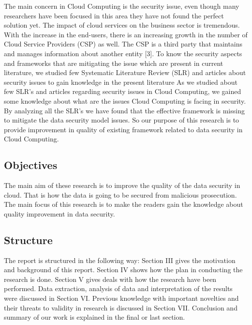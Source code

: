 The main concern in Cloud Computing is the security issue, even though many researchers have been focused in this area they have not found the perfect solution yet. The impact of cloud services on the business sector is tremendous. With the increase in the end-users, there is an increasing growth in the number of Cloud Service Providers (CSP) as well. The CSP is a third party that maintains and manages information about another entity [3]. To know the security aspects and frameworks that are mitigating the issue which are present in current literature, we studied few Systematic Literature Review (SLR) and articles about security issues to gain knowledge in the present literature
As we studied about few SLR’s and articles regarding security issues in Cloud Computing, we gained some knowledge about what are the issues Cloud Computing is facing in security. By analyzing all the SLR’s we have found that the effective framework is missing to mitigate the data security model issues. So our purpose of this research is to provide improvement in quality of existing framework related to data security in Cloud Computing. 

\subsection{Objectives}

The main aim of these research is to improve the quality of the data security in cloud. That is how the data is going to be secured from malicious prosecution.
The main focus of this research is to make the readers gain the knowledge about quality improvement in  data security.

\subsection{Structure} 
The report is structured in the following way:  
Section III gives the motivation and background of this report. Section IV shows how the plan in conducting the research is done. Section V gives deals with how the research have been performed. Data extraction, analysis of data and interpretation of the results were discussed in Section VI. Previous knowledge with important novelties and their threats to validity in research is discussed in Section VII. Conclusion and summary of our work is explained in the final or last section.   


\nocite{*}
